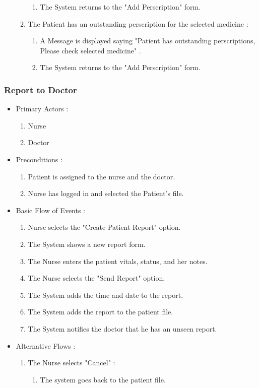 \documentclass[14pt]{article}
\begin{document}
\begin{itemize}
\begin{enumerate}
\begin{enumerate}
						\item The System returns to the "Add Perscription" form.
					\end{enumerate}
				\item The Patient has an outstanding perscription for the selected medicine :
					\begin{enumerate}
						\item A Message is displayed saying "Patient has outstanding perscriptions, Please check selected medicine" . 
						\item The System returns to the "Add Perscription" form.
					\end{enumerate}
			\end{enumerate}
\end{itemize}

\subsubsection{Report to Doctor}
\begin{itemize}
		\item Primary Actors : 
			\begin{enumerate}
				\item Nurse
				\item Doctor
			\end{enumerate}
		\item Preconditions :
			\begin{enumerate}
				\item Patient is assigned to the nurse and the doctor.
				\item Nurse has logged in and selected the Patient's file.
			\end{enumerate}
		\item Basic Flow of Events :
			\begin{enumerate}
				\item Nurse selects the "Create Patient Report" option.
				\item The System shows a new report form.
				\item The Nurse enters the patient vitals, status, and her notes.
				\item The Nurse selects the "Send Report" option.
				\item The System adds the time and date to the report.
				\item The System adds the report to the patient file.
				\item The System notifies the doctor that he has an unseen report.	
			\end{enumerate}
		\item Alternative Flows :
			\begin{enumerate}
				\item The Nurse selects "Cancel" : 
					\begin{enumerate}
						\item The system goes back to the patient file.
					\end{enumerate}
			\end{enumerate}
\end{itemize}
\end{document}
